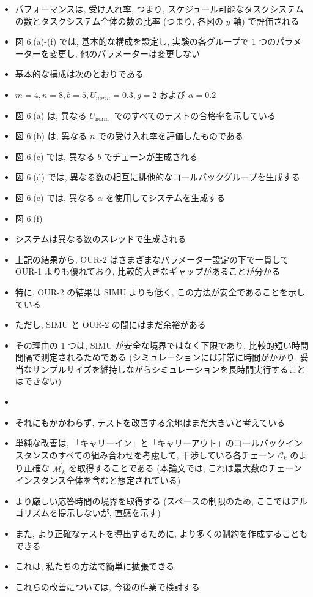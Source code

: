 \begin{frame}{}
    \begin{itemize}
        \item パフォーマンスは, 受け入れ率, つまり, スケジュール可能なタスクシステムの数とタスクシステム全体の数の比率 (つまり, 各図の $y$ 軸) で評価される
\item 図 6.(a)-(f) では, 基本的な構成を設定し, 実験の各グループで 1 つのパラメーターを変更し, 他のパラメーターは変更しない
\item 基本的な構成は次のとおりである
\item $m=4, n=8, b=5, U_{n o r m}=0.3, g=2$ および $\alpha=0.2$ 
\item 図 6.(a) は, 異なる $U_{\text {norm }}$ でのすべてのテストの合格率を示している
\item 図 6.(b) は, 異なる $n$ での受け入れ率を評価したものである
\item 図 6.(c) では, 異なる $b$ でチェーンが生成される
\item 図 6.(d) では, 異なる数の相互に排他的なコールバックグループを生成する
\item 図 6.(e) では, 異なる $\alpha$ を使用してシステムを生成する
\item 図 6.(f)
\item システムは異なる数のスレッドで生成される
    \end{itemize}
\end{frame}


\begin{frame}{}
    \begin{itemize}
        \item 上記の結果から, OUR-2 はさまざまなパラメーター設定の下で一貫して OUR-1 よりも優れており, 比較的大きなギャップがあることが分かる
\item 特に, OUR-2 の結果は SIMU よりも低く, この方法が安全であることを示している
\item ただし, SIMU と OUR-2 の間にはまだ余裕がある
\item その理由の 1 つは, SIMU が安全な境界ではなく下限であり, 比較的短い時間間隔で測定されるためである (シミュレーションには非常に時間がかかり, 妥当なサンプルサイズを維持しながらシミュレーションを長時間実行することはできない)
\item
\item それにもかかわらず, テストを改善する余地はまだ大きいと考えている
\item 単純な改善は, 「キャリーイン」と「キャリーアウト」のコールバックインスタンスのすべての組み合わせを考慮して, 干渉している各チェーン $\mathcal{C}_{k}$ のより正確な $\overrightarrow{\mathcal{M}}_{k}$ を取得することである (本論文では, これは最大数のチェーンインスタンス全体を含むと想定されている)
\item より厳しい応答時間の境界を取得する (スペースの制限のため, ここではアルゴリズムを提示しないが, 直感を示す)
\item また, より正確なテストを導出するために, より多くの制約を作成することもできる
\item これは, 私たちの方法で簡単に拡張できる
\item これらの改善については, 今後の作業で検討する
    \end{itemize}
\end{frame}


